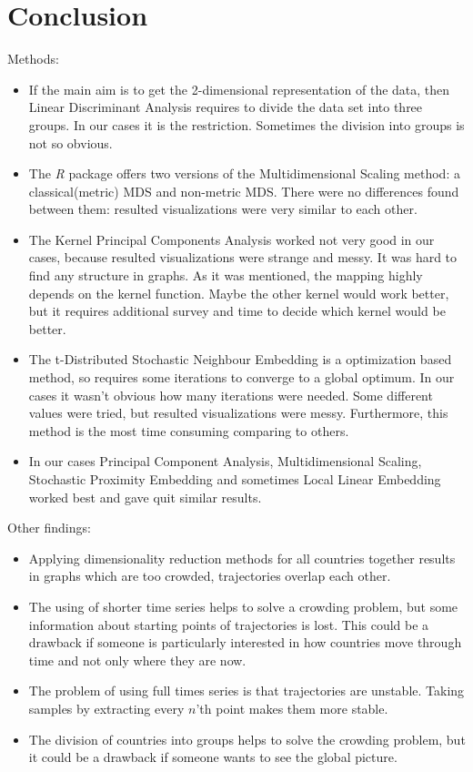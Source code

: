 \documentclass[a4paper]{article}
\begin{document}
\section{Conclusion}
Methods:
\begin{itemize}
  \item If the main aim is to get the 2-dimensional representation of the data, then Linear Discriminant Analysis requires to divide the data set into three groups. In our cases it is the restriction. Sometimes the division into groups is not so obvious.
  \item The \textit{R} package offers two versions of the Multidimensional Scaling method: a classical(metric) MDS and non-metric MDS. There were no differences found between them: resulted visualizations were very similar to each other.
  \item The Kernel Principal Components Analysis worked not very good in our cases, because resulted visualizations were strange and messy. It was hard to find any structure in graphs. As it was mentioned, the mapping highly depends on the kernel function. Maybe the other kernel would work better, but it requires additional survey and time to decide which kernel would be better. 
  \item The t-Distributed Stochastic Neighbour Embedding is a optimization based method, so requires some iterations to converge to a global optimum. In our cases it wasn't obvious how many iterations were needed. Some different values were tried, but resulted visualizations were messy. Furthermore, this method is the most time consuming comparing to others.
  \item In our cases Principal Component Analysis, Multidimensional Scaling, Stochastic Proximity Embedding and sometimes Local Linear Embedding worked best and gave quit similar results.  
\end{itemize}

Other findings:
\begin{itemize}
  \item Applying dimensionality reduction methods for all countries together results in graphs which are too crowded, trajectories overlap each other.
  \item The using of shorter time series helps to solve a crowding problem, but some information about starting points of trajectories is lost. This could be a drawback if someone is particularly interested in how countries move through time and not only where they are now. 
  \item The problem of using full times series is that trajectories are unstable. Taking samples by extracting every $n$'th point
  makes them more stable.
  \item The division of countries into groups helps to solve the crowding problem, but it could be a drawback if someone wants to see the global picture.
\end{itemize}
\end{document}
